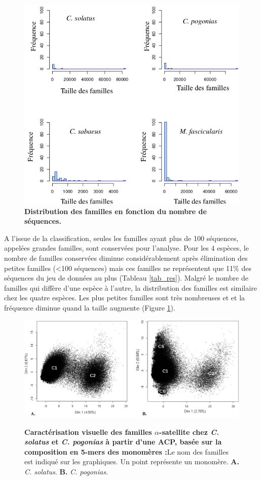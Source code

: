 \documentclass[12pt,a4paper]{article}
\begin{document}
		\begin{figure}
			\center
			\includegraphics[scale=0.45]{img/distribution_familles.png}
			\caption{\textbf{Distribution des familles en fonction du nombre de séquences.}}
			\label{dist_fam} 
		\end{figure}

	A l'issue de la classification, seules les familles ayant plus de 100 séquences, appelées grandes familles, sont conservées pour l'analyse. Pour les 4 espèces, le nombre de familles conservées diminue considérablement après élimination des petites familles (<100 séquences) mais ces familles ne représentent que 11\% des séquences du jeu de données au plus (Tableau \ref{tab_res}). Malgré le nombre de familles qui diffère d'une espèce à l'autre, la distribution des familles est similaire chez les quatre espèces. Les plus petites familles sont très nombreuses et et la fréquence diminue quand la taille augmente (Figure \ref{dist_fam}). 

		\begin{figure}	
			\includegraphics[scale=0.4]{img/ACP_experimental.png}  \\
			\caption{\textbf{Caractérisation visuelle des familles $\alpha$-satellite chez \textit{C. solatus} et \textit{C. pogonias} à partir d'une ACP, basée sur la composition en 5-mers des monomères :}Le nom des familles est indiqué sur les graphiques. Un point représente un monomère. \textbf{A.} \textit{C. solatus}. \textbf{B.} \textit{C. pogonias}.}
			\label{fig:ACP_exp} 
	\end{figure}	
	
\end{document}
